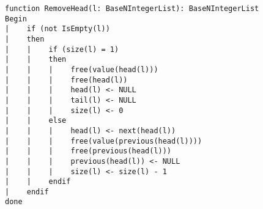 \begin{lstlisting}[breaklines]
function RemoveHead(l: BaseNIntegerList): BaseNIntegerList
Begin
|    if (not IsEmpty(l))
|    then
|    |    if (size(l) = 1)
|    |    then
|    |    |    free(value(head(l)))
|    |    |    free(head(l))
|    |    |    head(l) <- NULL
|    |    |    tail(l) <- NULL
|    |    |    size(l) <- 0
|    |    else
|    |    |    head(l) <- next(head(l))
|    |    |    free(value(previous(head(l))))
|    |    |    free(previous(head(l)))
|    |    |    previous(head(l)) <- NULL
|    |    |    size(l) <- size(l) - 1
|    |    endif
|    endif
done
\end{lstlisting}
